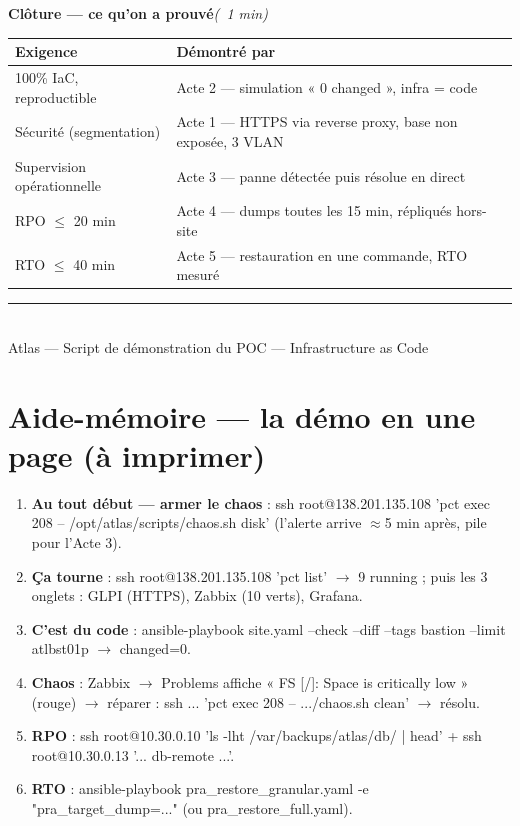 \documentclass[11pt,a4paper]{article}
\newcommand{\acte}[2]{%
  \begin{tcolorbox}[enhanced,colback=atlasdark,colframe=atlasdark,coltext=white,
    sharp corners,boxrule=0pt,left=3mm,right=3mm,top=2mm,bottom=2mm,
    before skip=10pt,after skip=6pt]%
    {\bfseries\large #1}\dur{#2}%
  \end{tcolorbox}}
\newcommand{\cmd}[1]{{\ttfamily #1}}
\newcommand{\dur}[1]{\hfill{\small\color{codecom}\itshape (#1)}}
\begin{document}
\acte{Clôture — ce qu'on a prouvé}{~1 min}

\begin{table}[h]
\centering\small
\renewcommand{\arraystretch}{1.25}
\begin{tabularx}{\linewidth}{@{}l X@{}}
\toprule
\textbf{Exigence} & \textbf{Démontré par} \\
\midrule
100\% IaC, reproductible   & Acte 2 — simulation « 0 changed », infra = code \\
Sécurité (segmentation)    & Acte 1 — HTTPS via reverse proxy, base non exposée, 3 VLAN \\
Supervision opérationnelle & Acte 3 — panne détectée puis résolue en direct \\
RPO $\leq$ 20 min          & Acte 4 — dumps toutes les 15 min, répliqués hors-site \\
RTO $\leq$ 40 min          & Acte 5 — restauration en une commande, RTO mesuré \\
\bottomrule
\end{tabularx}
\end{table}

\begin{center}
{\color{atlasblue}\rule{0.5\linewidth}{1pt}}\\[4pt]
{\small\color{codecom} Atlas — Script de démonstration du POC — Infrastructure as Code}
\end{center}

\newpage
\section*{Aide-mémoire — la démo en une page (à imprimer)}

\begin{enumerate}[leftmargin=1.5em,itemsep=4pt]
  \item \textbf{Au tout début — armer le chaos} : \cmd{ssh root@138.201.135.108 'pct exec 208 -- /opt/atlas/scripts/chaos.sh disk'} (l'alerte arrive $\approx$5 min après, pile pour l'Acte 3).
  \item \textbf{Ça tourne} : \cmd{ssh root@138.201.135.108 'pct list'} $\rightarrow$ 9 running ;
        puis les 3 onglets : GLPI (HTTPS), Zabbix (10 verts), Grafana.
  \item \textbf{C'est du code} : \cmd{ansible-playbook site.yaml --check --diff --tags bastion --limit atlbst01p} $\rightarrow$ changed=0.
  \item \textbf{Chaos} : Zabbix $\rightarrow$ Problems affiche « FS [/]: Space is critically low » (rouge) $\rightarrow$ réparer : \cmd{ssh ... 'pct exec 208 -- .../chaos.sh clean'} $\rightarrow$ résolu.
  \item \textbf{RPO} : \cmd{ssh root@10.30.0.10 'ls -lht /var/backups/atlas/db/ | head'} + \cmd{ssh root@10.30.0.13 '... db-remote ...'}.
  \item \textbf{RTO} : \cmd{ansible-playbook pra_restore_granular.yaml -e "pra_target_dump=..."} (ou \cmd{pra_restore_full.yaml}).
\end{enumerate}
\end{document}

